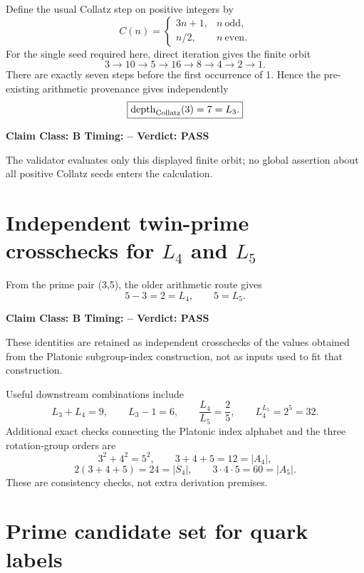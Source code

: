 \documentclass[11pt,a4paper,twoside]{book}
\def\({}%
\def\){}%
\theoremstyle{definition}
\newcommand{\vTwelveStatus}[3]{\par\noindent\textbf{Claim Class: #1 \quad Timing: #2 \quad Verdict: #3}\par}
\begin{document}
Define the usual Collatz step on positive integers by
\begin{equation}
C(n)=
\begin{cases}
3n+1, & n\ \text{odd},\\
n/2, & n\ \text{even}.
\end{cases}
\label{eq:v12-collatz-map}
\end{equation}
For the single seed required here, direct iteration gives the finite orbit
\begin{equation}
\boxed{
3\to10\to5\to16\to8\to4\to2\to1.
}
\label{eq:v12-collatz-three-orbit}
\end{equation}
There are exactly seven steps before the first occurrence of \(1\).  Hence the
pre-existing arithmetic provenance gives independently
\begin{equation}
\boxed{\operatorname{depth}_{\rm Collatz}(3)=7=L_3.}
\label{eq:v12-L3}
\end{equation}
\vTwelveStatus{B}{--}{PASS}
The validator evaluates only this displayed finite orbit; no global assertion
about all positive Collatz seeds enters the calculation.

\section[Independent twin-prime crosschecks for L4 and L5]{Independent twin-prime crosschecks for $L_4$ and $L_5$}

From the prime pair \((3,5)\), the older arithmetic route gives
\begin{equation}
\boxed{5-3=2=L_4,}
\qquad
\boxed{5=L_5.}
\label{eq:v12-L4-L5}
\end{equation}
\vTwelveStatus{B}{--}{PASS}
These identities are retained as independent crosschecks of the values obtained
from the Platonic subgroup-index construction, not as inputs used to fit that
construction.

Useful downstream combinations include
\[
L_3+L_4=9,
\qquad
L_3-1=6,
\qquad
\frac{L_4}{L_5}=\frac25,
\qquad
L_4^{L_5}=2^5=32.
\]
Additional exact checks connecting the Platonic index alphabet and the three
rotation-group orders are
\[
3^2+4^2=5^2,
\qquad
3+4+5=12=|A_4|,
\]
\[
2(3+4+5)=24=|S_4|,
\qquad
3\cdot4\cdot5=60=|A_5|.
\]
These are consistency checks, not extra derivation premises.

\section{Prime candidate set for quark labels}
\end{document}

